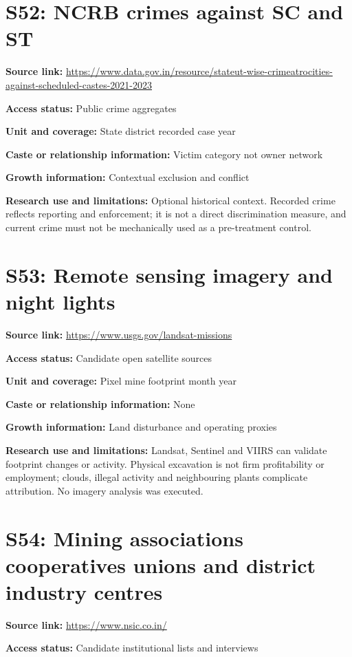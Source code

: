 \documentclass[11pt,a4paper]{report}
\begin{document}
\section{S52: NCRB crimes against SC and ST}\hypertarget{S52}{}
\textbf{Source link:} \url{https://www.data.gov.in/resource/stateut-wise-crimeatrocities-against-scheduled-castes-2021-2023}

\textbf{Access status:} Public crime aggregates

\textbf{Unit and coverage:} State district recorded case year

\textbf{Caste or relationship information:} Victim category not owner network

\textbf{Growth information:} Contextual exclusion and conflict

\textbf{Research use and limitations:} Optional historical context. Recorded crime reflects reporting and enforcement; it is not a direct discrimination measure, and current crime must not be mechanically used as a pre-treatment control.

\section{S53: Remote sensing imagery and night lights}\hypertarget{S53}{}
\textbf{Source link:} \url{https://www.usgs.gov/landsat-missions}

\textbf{Access status:} Candidate open satellite sources

\textbf{Unit and coverage:} Pixel mine footprint month year

\textbf{Caste or relationship information:} None

\textbf{Growth information:} Land disturbance and operating proxies

\textbf{Research use and limitations:} Landsat, Sentinel and VIIRS can validate footprint changes or activity. Physical excavation is not firm profitability or employment; clouds, illegal activity and neighbouring plants complicate attribution. No imagery analysis was executed.

\section{S54: Mining associations cooperatives unions and district industry centres}\hypertarget{S54}{}
\textbf{Source link:} \url{https://www.nsic.co.in/}

\textbf{Access status:} Candidate institutional lists and interviews
\end{document}
